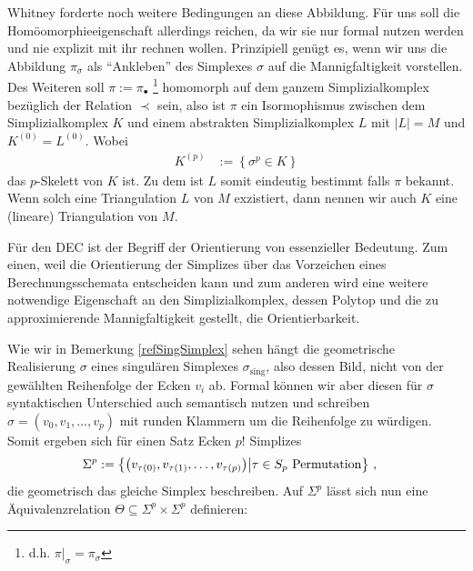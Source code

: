 \begin{bemerkung}
      Whitney \cite{whitney} forderte noch weitere Bedingungen an diese Abbildung. 
      Für uns soll die Homöomorphieeigenschaft allerdings reichen, da wir sie nur formal nutzen werden und nie explizit mit ihr rechnen wollen.
      Prinzipiell genügt es, wenn wir uns die Abbildung \( \pi_{\sigma} \) als "`Ankleben"' des Simplexes \( \sigma \) auf die Mannigfaltigkeit vorstellen.
      Des Weiteren soll \( \pi:=\pi_{\bullet} \) \footnote{d.h. \( \pi|_{\sigma} = \pi_{\sigma} \)} homomorph auf dem ganzem Simplizialkomplex bezüglich der Relation \( \prec \) sein, 
      also ist \( \pi \) ein Isormophismus zwischen dem Simplizialkomplex \( K \) und einem abstrakten Simplizialkomplex \( L \) mit \( |L| = M \) und \( K^{(0)} = L^{(0)} \).
      Wobei
      \begin{align}
        K^{(p)} &:= \left\{ \sigma^{p} \in K \right\}
      \end{align}
      das \( p \)-Skelett von \( K \) ist. 
      Zu dem ist \( L \) somit eindeutig bestimmt falls \( \pi \) bekannt. 
      Wenn solch eine Triangulation \( L \) von \( M \) exzistiert, dann nennen wir auch \( K \) eine (lineare) Triangulation von \( M \).
    \end{bemerkung}

    Für den DEC ist der Begriff der Orientierung von essenzieller Bedeutung. 
    Zum einen, weil die Orientierung der Simplizes über das Vorzeichen eines Berechnungsschemata entscheiden kann 
    und zum anderen wird eine weitere notwendige Eigenschaft an den Simplizialkomplex, dessen Polytop und die zu approximierende Mannigfaltigkeit gestellt, die Orientierbarkeit.

    Wie wir in Bemerkung \ref{refSingSimplex} sehen hängt die geometrische Realisierung \( \sigma \) eines singulären Simplexes \( \sigma_{\text{sing}} \), 
    also dessen Bild, nicht von der gewählten Reihenfolge der Ecken \( v_{i} \) ab. 
    Formal können wir aber diesen für \( \sigma \) syntaktischen Unterschied auch semantisch nutzen und schreiben \( \sigma = \left( v_{0}, v_{1}, \ldots, v_{p} \right) \)
    mit runden Klammern um die Reihenfolge zu würdigen. 
    Somit ergeben sich für einen Satz Ecken \( p! \) Simplizes 
    \begin{align}
      \Sigma^{p} &:= \left\{ \left( v_{\tau(0)}, v_{\tau(1)}, \ldots, v_{\tau(p)} \right) \middle| \tau\in S_{p} \text{ Permutation} \right\} \,\text{,}
    \end{align}
    die geometrisch das gleiche Simplex beschreiben.
    Auf \( \Sigma^{p} \) lässt sich nun eine Äquivalenzrelation \( \Theta \subseteq \Sigma^{p}\times\Sigma^{p} \) definieren:

